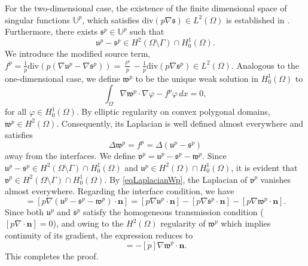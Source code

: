 \documentclass[oneside]{article}
\begin{document}
\noindent For the two-dimensional case, the existence of the finite dimensional space of singular functions $\mathbb{U}^p$, which satisfies $\text{div}(p\nabla \mathfrak{s})\in L^2(\Omega)$ is established in \cite{kellogg1971singularities}. Furthermore, there exists $\mathfrak{s}^p\in \mathbb{U}^p$ such that 
\begin{equation}
\mathfrak{u}^p-\mathfrak{s}^p \in H^2(\Omega\setminus\Gamma)\cap H^1_0(\Omega). 
\end{equation}
We introduce the modified source term, $f^p=\frac{1}{p}\text{div}(p(\nabla \mathfrak{u}^p-\nabla \mathfrak{s}^p)) = \frac{\ell^p}{p}-\frac{1}{p}\text{div}(p\nabla \mathfrak{s}^p)\in L^2(\Omega)$. Analogous to the one-dimensional case, we define $\mathfrak{w}^p$ to be the unique weak solution in $H^1_0(\Omega)$ to 
\begin{equation}
   \int_\Omega \nabla \mathfrak{w}^p\cdot\nabla\varphi -f^p\varphi\,dx=0,
\end{equation}
for all $\varphi\in H^1_0(\Omega)$. By elliptic regularity on convex polygonal domains, $\mathfrak{w}^p\in H^2(\Omega)$. Consequently, its Laplacian is well defined almost everywhere and satisfies 
\begin{equation}\label{eqLaplacianWp}
\Delta \mathfrak{w}^p = f^p=\Delta\left(\mathfrak{u}^p-\mathfrak{s}^p\right)
\end{equation}
away from the interfaces. We define $\mathfrak{v}^p=\mathfrak{u}^p-\mathfrak{s}^p-\mathfrak{w}^p$. Since $\mathfrak{u}^p-\mathfrak{s}^p\in H^2(\Omega\setminus\Gamma)\cap H^1_0(\Omega)$ and $\mathfrak{u}^p\in H^2(\Omega)\cap H^1_0(\Omega)$, it is evident that $\mathfrak{v}^p\in H^2(\Omega\setminus\Gamma)\cap H^1_0(\Omega)$. By \eqref{eqLaplacianWp}, the Laplacian of $\mathfrak{v}^p$ vanishes almost everywhere. Regarding the interface condition, we have 
\begin{equation}
[p\nabla \mathfrak{v}^p\cdot \mathbf{n}]=[p\nabla (\mathfrak{u}^p-\mathfrak{s}^p-\mathfrak{w}^p)\cdot \mathbf{n}]=[p\nabla \mathfrak{u}^p\cdot \mathbf{n}]-[p\nabla \mathfrak{s}^p\cdot \mathbf{n}]-[p\nabla \mathfrak{w}^p\cdot \mathbf{n}].
\end{equation}
Since both $\mathfrak{u}^p$ and $\mathfrak{s}^p$ satisfy the homogeneous transmission condition ($[p\nabla \cdot \mathbf{n}] = 0$), and owing to the $H^2(\Omega)$ regularity of $\mathfrak{w}^p$ which implies continuity of its gradient, the expression reduces to
\begin{equation}
[p\nabla \mathfrak{v}^p \cdot \mathbf{n}] = -[p] \nabla \mathfrak{w}^p \cdot \mathbf{n}.
\end{equation}
This completes the proof.
\end{document}
